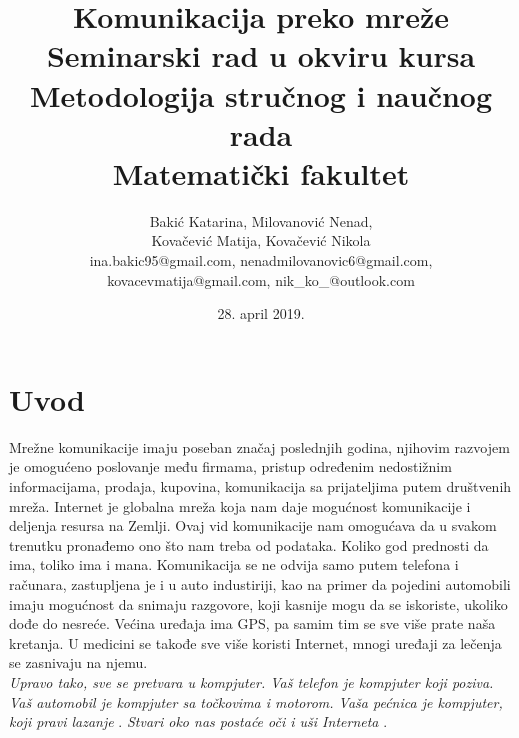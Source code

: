 \documentclass[a4paper]{article}
\begin{document}
	
	\title{Komunikacija preko mreže\\ \small{Seminarski rad u okviru kursa\\Metodologija stručnog i naučnog rada\\ Matematički fakultet}}
	
	\author{Bakić Katarina, Milovanović Nenad, \\Kovačević Matija, Kovačević Nikola\\
	ina.bakic95@gmail.com, nenadmilovanovic6@gmail.com, \\kovacevmatija@gmail.com, nik\_ko\_@outlook.com}
	
	\date{28. april 2019.}
	
\maketitle
{}
	
\tableofcontents

\newpage

\section{Uvod}
\label{sec:uvod}
Mrežne komunikacije imaju poseban značaj poslednjih godina, njihovim razvojem je omogućeno poslovanje među firmama, pristup određenim nedostižnim informacijama, prodaja, kupovina, komunikacija sa prijateljima putem društvenih mreža. Internet je globalna mreža koja nam daje mogućnost komunikacije i deljenja resursa na Zemlji. Ovaj vid komunikacije nam omogućava da u svakom trenutku pronađemo ono što nam treba od podataka. Koliko god prednosti da ima, toliko ima i mana. Komunikacija se ne odvija samo putem telefona i računara, zastupljena je i u auto industiriji, kao na primer da pojedini automobili imaju mogućnost da snimaju razgovore, koji kasnije mogu da se iskoriste, ukoliko dođe do nesreće. Većina uređaja ima GPS, pa samim tim se sve više prate naša kretanja. U medicini se takođe sve više koristi Internet, mnogi uređaji za lečenja se zasnivaju na njemu. \\
		{\em Upravo tako, sve se pretvara u kompjuter. Vaš telefon je kompjuter koji poziva. Vaš automobil je kompjuter sa točkovima i motorom. Vaša pećnica je kompjuter, koji pravi lazanje} \cite{dataAndGoliath}.%
		{\em Stvari oko nas postaće oči i uši Interneta } \cite{dataAndGoliath}. %
        
\end{document}
